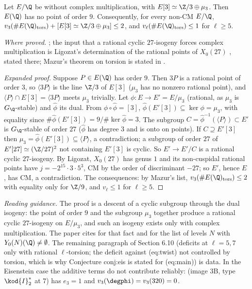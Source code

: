 \begin{sloppypar}
\begin{proposition}\label{prop:paper:no9}
Let $E/\Q$ be without complex multiplication, with $E[3]\simeq\Z/3\oplus\mu_3$. Then $E(\Q)$ has no point of order $9$. Consequently, for every non-CM $E/\Q$,
$v_3(\#E(\Q)_{\mathrm{tors}})+[E[3]\simeq\Z/3\oplus\mu_3]\le2$, and $v_\ell(\#E(\Q)_{\mathrm{tors}})\le1$ for $\ell\ge5$.
\end{proposition}

\noindent\emph{Where proved.} ; the input that a rational cyclic $27$-isogeny forces complex multiplication is Ligozat's determination of the rational points of $X_0(27)$
\cite{Ligozat75}, stated there; Mazur's theorem on torsion \cite{Mazur77} is stated in .

\begin{proof}[Expanded proof]
Suppose $P\in E(\Q)$ has order $9$. Then $3P$ is a rational point of order $3$, so $\langle3P\rangle$ is the line $\Z/3$ of $E[3]$ ($\mu_3$ has no nonzero rational point), and $\langle P\rangle\cap E[3]=\langle3P\rangle$
meets $\mu_3$ trivially. Let $\phi\colon E\to E'=E/\mu_3$ (rational, as $\mu_3$ is $G_\Q$-stable) and $\hat\phi$ its dual. From $\phi\circ\hat\phi=[3]$, $\hat\phi(E'[3])\subseteq\ker\phi=\mu_3$, with equality since
$\#\hat\phi(E'[3])=9/\#\ker\hat\phi=3$. The subgroup $C=\hat\phi^{-1}(\langle P\rangle)\subset E'$ is $G_\Q$-stable of order $27$ ($\hat\phi$ has degree $3$ and is onto on points). If $C\supseteq E'[3]$ then
$\mu_3=\hat\phi(E'[3])\subseteq\langle P\rangle$, a contradiction; a subgroup of order $27$ of $E'[27]\simeq(\Z/27)^2$ not containing $E'[3]$ is cyclic. So $E'\to E'/C$ is a rational cyclic $27$-isogeny. By
Ligozat, $X_0(27)$ has genus $1$ and its non-cuspidal rational points have $j=-2^{15}\cdot3\cdot5^3$, CM by the order of discriminant $-27$; so $E'$, hence $E$, has CM, a contradiction. The
consequences: by Mazur's list, $v_3(\#E(\Q)_{\mathrm{tors}})\le2$ with equality only for $\Z/9$, and $v_\ell\le1$ for $\ell\ge5$.
\end{proof}

\noindent\emph{Reading guidance.} The proof is a descent of a cyclic subgroup through the dual isogeny: the point of order $9$ and the subgroup $\mu_3$ together produce a
rational cyclic $27$-isogeny on $E/\mu_3$, and such an isogeny exists only with complex multiplication. The paper cites \cite{Ligozat75} for that fact and \cite[Theorem 1]{Kenku} for
the list of levels $N$ with $Y_0(N)(\Q)\ne\emptyset$. The remaining paragraph of Section 6.10 (deficits at $\ell=5,7$ only with rational $\ell$-torsion; the deficit against (eq:twist) not
controlled by torsion, which is why Conjecture conj:eis is stated for (eq:main)) is data. In the Eisenstein case the additive terms do not contribute reliably:  (image 3B, type
$\kod{I}_2^*$ at $7$) has $e_3=1$ and $v_3(\degphi)=v_3(320)=0$.


\end{sloppypar}
